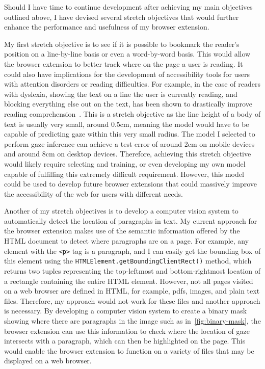 \documentclass{report}
\begin{document}
Should I have time to continue development after achieving my main objectives outlined above, I have devised several stretch objectives that would further enhance the performance and usefulness of my browser extension. 

My first stretch objective is to see if it is possible to bookmark the reader's position on a line-by-line basis or even a word-by-word basis. This would allow the browser extension to better track where on the page a user is reading. It could also have implications for the development of accessibility tools for users with attention disorders or reading difficulties. For example, in the case of readers with dyslexia, showing the text on a line the user is currently reading, and blocking everything else out on the text, has been shown to drastically improve reading comprehension~\cite{mutalib2022student}. This is a stretch objective as the line height of a body of text is usually very small, around 0.5cm, meaning the model would have to be capable of predicting gaze within this very small radius. The model I selected to perform gaze inference can achieve a test error of around 2cm on mobile devices and around 8cm on desktop devices. Therefore, achieving this stretch objective would likely require selecting and training, or even developing my own model capable of fulfilling this extremely difficult requirement. However, this model could be used to develop future browser extensions that could massively improve the accessibility of the web for users with different needs. 

Another of my stretch objectives is to develop a computer vision system to automatically detect the location of paragraphs in text. My current approach for the browser extension makes use of the semantic information offered by the HTML document to detect where paragraphs are on a page. For example, any element with the \texttt{<p>} tag is a paragraph, and I can easily get the bounding box of this element using the \texttt{HTMLElement.getBoundingClientRect()} method, which returns two tuples representing the top-leftmost and bottom-rightmost location of a rectangle containing the entire HTML element. However, not all pages visited on a web browser are defined in HTML, for example, pdfs, images, and plain text files. Therefore, my approach would not work for these files and another approach is necessary. By developing a computer vision system to create a binary mask showing where there are paragraphs in the image such as in~\autoref{fig:binary-mask}, the browser extension can use this information to check where the location of gaze intersects with a paragraph, which can then be highlighted on the page. This would enable the browser extension to function on a variety of files that may be displayed on a web browser. 
\end{document}
